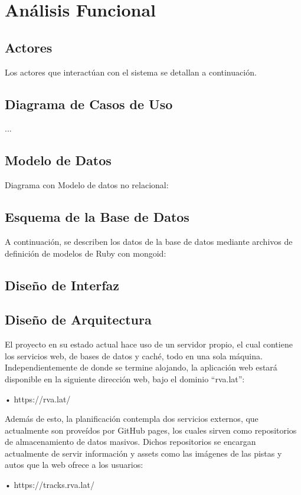 \chapter{Análisis Funcional}

\section{Actores}
Los actores que interactúan con el sistema se detallan a continuación.

\section{Diagrama de Casos de Uso}
...

\section{Modelo de Datos}
Diagrama con Modelo de datos no relacional:

\section{Esquema de la Base de Datos}
A continuación, se describen los datos de la base de datos mediante archivos de definición de modelos de Ruby con mongoid:

\section{Diseño de Interfaz}

\section{Diseño de Arquitectura}
El proyecto en su estado actual hace uso de un servidor propio, el cual contiene los servicios web, de bases de datos y caché, todo en una sola máquina. Independientemente de donde se termine alojando, la aplicación web estará disponible en la siguiente dirección web, bajo el dominio “rva.lat”:

•	https://rva.lat/

Además de esto, la planificación contempla dos servicios externos, que actualmente son proveídos por GitHub pages, los cuales sirven como repositorios de almacenamiento de datos masivos. Dichos repositorios se encargan actualmente de servir información y assets como las imágenes de las pistas y autos que la web ofrece a los usuarios:

•	https://tracks.rva.lat/

